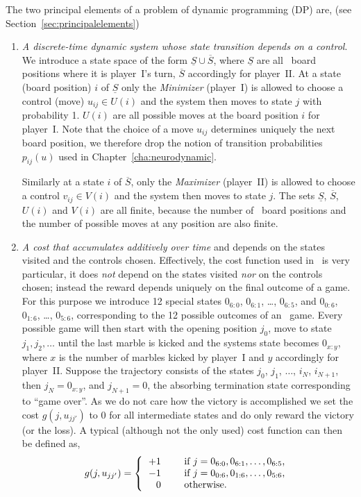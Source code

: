 The two principal elements of a problem of dynamic programming (DP) are, (see Section~\ref{sec:principalelements})
\begin{enumerate}
\item \emph{A discrete-time dynamic system whose state transition depends on a control}. We introduce a state space of the form $\underline{S} \cup \overline{S}$, where $\underline{S}$ are all \Abalone\ board positions where it is player~I's turn, $\overline{S}$ accordingly for player~II. At a state (board position) $i$ of $\underline{S}$ only the \emph{Minimizer} (player~I) is allowed to choose a control (move) $u_{ij} \in U(i)$ and the system then moves to state $j$ with probability 1. $U(i)$ are all possible moves at the board position $i$ for player~I. Note that the choice of a move $u_{ij}$ determines uniquely the next board position, we therefore drop the notion of transition probabilities $p_{ij}(u)$ used in Chapter~\ref{cha:neurodynamic}.

Similarly at a state $i$ of $\overline{S}$, only the \emph{Maximizer} (player~II) is allowed to choose a control $v_{ij} \in V(i)$ and the system then moves to state $j$. The sets $\underline{S}$, $\overline{S}$, $U(i)$ and $V(i)$ are all finite, because the number of \Abalone\ board positions and the number of possible moves at any position are also finite. 

\item \emph{A cost that accumulates additively over time} and depends on the states visited and the controls chosen. Effectively, the cost function used in \Abalone\ is very particular, it does \emph{not} depend on the states visited \emph{nor} on the controls chosen; instead the reward depends uniquely on the final outcome of a game. For this purpose we introduce 12 special states $0_{6:0}$, $0_{6:1}$, \ldots, $0_{6:5}$, and $0_{0:6}$, $0_{1:6}$, \ldots, $0_{5:6}$, corresponding to the 12 possible outcomes of an \Abalone\ game. Every possible game will then start with the opening position $j_0$, move to state $j_1,j_2, \ldots$ until the last marble is kicked and the systems state becomes $0_{x:y}$, where $x$ is the number of marbles kicked by player~I and $y$ accordingly for player~II. Suppose the trajectory consists of the states $j_0$, $j_1$, $\ldots$, $i_{N}$, $i_{N+1}$, then $j_{N} = 0_{x:y}$, and $j_{N+1} = 0$, the absorbing termination state corresponding to ``game over''. As we do not care how the victory is accomplished we set the cost $g(j,u_{jj'})$ to $0$ for all intermediate states and do only reward the victory (or the loss). A typical (although not the only used) cost function can then be defined as,
\begin{equation} \label{eq:impl:cost}
 g(j,u_{jj'}) = \left \{
\begin{tabular}{rcl}
$+1$ & & if $j = 0_{6:0}, 0_{6:1}, \ldots, 0_{6:5}$, \\
$-1$ & & if $j = 0_{0:6}, 0_{1:6}, \ldots, 0_{5:6}$, \\
0 & \qquad & otherwise. \\
\end{tabular}
\right . 
\end{equation}
\end{enumerate}

